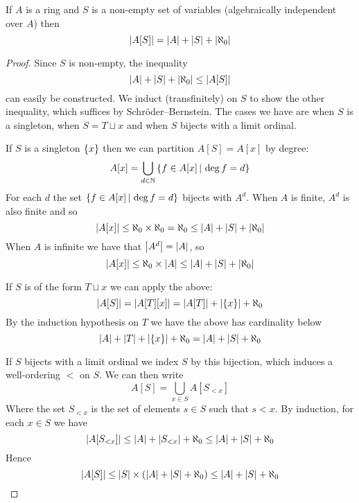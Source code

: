\begin{lem}
  If $A$ is a ring and $S$ is a non-empty set of variables
  (algebraically independent over $A$)
  then
  \[
    \left\vert A[S] \right\vert = \left\vert A \right\vert + \left\vert S \right\vert + \left\vert \aleph_{0} \right\vert
  \]
\end{lem}
\begin{proof}
  Since $S$ is non-empty, the inequality
  \[
    \left\vert A \right\vert + \left\vert S \right\vert + \left\vert \aleph_{0} \right\vert \leq \left\vert A[S] \right\vert
  \]
  can easily be constructed.
  We induct (transfinitely) on $S$ to show the other inequality,
  which suffices by Schröder–Bernstein.
  The cases we have are when $S$ is a singleton,
  when $S = T \sqcup {x}$ and when $S$ bijects with a limit ordinal.

  If $S$ is a singleton $\left\{x\right\}$ then we can partition $A[S] = A[x]$
  by degree:
  \[
    A[x] = \bigcup_{d \in \mathbb{N}} \left\{f \in A[x] \,|\, \deg f = d\right\}
  \]
  For each $d$ the set $\left\{f \in A[x] \,|\, \deg f = d\right\}$ bijects with $A^{d}$.
  When $A$ is finite, $A^{d}$ is also finite and so
  \[
    \left\vert A[x] \right\vert \leq \aleph_{0} \times \aleph_{0} = \aleph_{0} \leq \left\vert A \right\vert + \left\vert S \right\vert + \left\vert \aleph_{0} \right\vert
  \]
  When $A$ is infinite we have that $\left\vert A^{d} \right\vert = \left\vert A \right\vert$, so
  \[
    \left\vert A[x] \right\vert \leq \aleph_{0} \times \left\vert A \right\vert \leq \left\vert A \right\vert + \left\vert S \right\vert + \left\vert \aleph_{0} \right\vert
  \]

  If $S$ is of the form $T \sqcup {x}$ we can apply the above:
  \[
    \left\vert A[S] \right\vert = \left\vert A[T][x] \right\vert = \left\vert A[T] \right\vert + \left\vert \left\{x\right\} \right\vert + \aleph_{0}
  \]
  By the induction hypothesis on $T$ we have the above has cardinality below
  \[
    \left\vert A \right\vert + \left\vert T \right\vert + \left\vert \left\{x\right\} \right\vert + \aleph_{0} = \left\vert A \right\vert + \left\vert S \right\vert + \aleph_{0}
  \]

  If $S$ bijects with a limit ordinal we index $S$ by this bijection,
  which induces a well-ordering $<$ on $S$. We can then write
  \[
    A[S] = \bigcup_{x \in S} A[S_{< x}]
  \]
  Where the set $S_{<x}$ is the set of elements $s \in S$ such that $s < x$.
  By induction, for each $x \in S$ we have
  \[
    \left\vert A[S_{<x}] \right\vert \leq \left\vert A \right\vert + \left\vert S_{<x} \right\vert + \aleph_{0} \leq \left\vert A \right\vert + \left\vert S \right\vert + \aleph_{0}
  \]
  Hence
  \[
    \left\vert A[S] \right\vert \leq \left\vert S \right\vert \times \left(\left\vert A \right\vert + \left\vert S \right\vert + \aleph_{0}\right) \leq \left\vert A \right\vert + \left\vert S \right\vert + \aleph_{0}
  \]
\end{proof}

